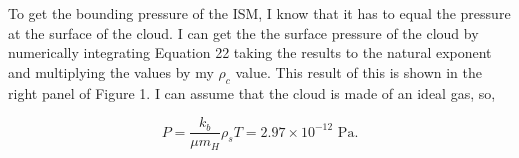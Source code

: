 \documentclass[12pt]{article}
\begin{document}
\begin{itemize}
To get the bounding pressure of the ISM, I know that it has to equal the pressure at the surface of the cloud. I can get the the surface pressure of the cloud by numerically integrating Equation 22 taking the results to the natural exponent and multiplying the values by my $\rho_c$ value. This result of this is shown in the right panel of Figure 1. I can assume that the cloud is made of an ideal gas, so,

\begin{equation}
P = \frac{k_b}{\mu m_H}\rho_s T = 2.97 \times 10^{-12} \text{ Pa}.
\end{equation}

\end{itemize}
\end{document}
